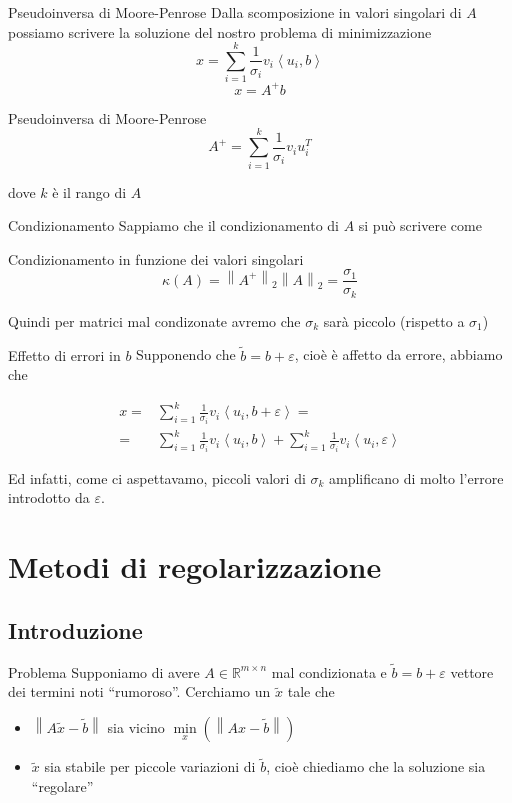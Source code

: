 \documentclass{beamer}
\theoremstyle{plain}
\theoremstyle{definition}
\theoremstyle{remark}
\newcommand{\set}[1]{\left\{#1\right\}}
\newcommand{\pa}[1]{\left(#1\right)}
\newcommand{\ang}[1]{\left<#1\right>}
\newcommand{\norm}[1]{\left\|#1\right\|}
\begin{document}
\begin{frame}{Pseudoinversa di Moore-Penrose}
  Dalla scomposizione in valori singolari di $A$ possiamo scrivere la
  soluzione del nostro problema di minimizzazione
  \[ x = \sum _{i=1} ^k \frac{1}{\sigma _i} v_i \ang{u_i,b} \]
  \[ x = A^+ b \]
  \begin{block}{Pseudoinversa di Moore-Penrose}
    \[ A^+ = \sum _{i=1} ^k \frac{1}{\sigma _i} v_i u_i ^T\]
  \end{block}
  dove $k$ è il rango di $A$
\end{frame}

\begin{frame}{Condizionamento}
  Sappiamo che il condizionamento di $A$ si può scrivere come
  \begin{block}{Condizionamento in funzione dei valori singolari}
    \[ \kappa (A) = \norm{A^+}_2\norm{A}_2 = \frac{\sigma _1}{\sigma
    _k} \]
  \end{block}

  Quindi per matrici mal condizonate avremo che $\sigma _k$ sarà
  piccolo (rispetto a $\sigma_1$)
\end{frame}

\begin{frame}{Effetto di errori in $b$}
  Supponendo che $\tilde b = b+ \varepsilon$, cioè è affetto da
  errore, abbiamo che 
  
  \begin{align*}
    x =& \sum _{i=1} ^k \frac{1}{\sigma _i} v_i \ang{u_i,b +
      \varepsilon} = \\
    =& \sum _{i=1} ^k \frac{1}{\sigma _i} v_i \ang{u_i,b} + \sum
    _{i=1} ^k \frac{1}{\sigma _i} v_i \ang{u_i,\varepsilon}
  \end{align*}

  Ed infatti, come ci aspettavamo, piccoli valori di $\sigma_k$
  amplificano di molto l'errore introdotto da $\varepsilon$.
\end{frame}


\section{Metodi di regolarizzazione}

\subsection{Introduzione}

\begin{frame}{Problema}
  Supponiamo di avere $A\in \mathbb{R}^{m \times n}$ mal condizionata
  e $\tilde b = b + \varepsilon$ vettore dei termini noti
  ``rumoroso''. Cerchiamo un $\tilde x$ tale che
  \begin{itemize}
  \item $\norm{A\tilde x-\tilde b}$ sia vicino $\min \limits_x
    \pa{\norm{A x - \tilde b}}$
  \item $\tilde x$ sia stabile per piccole variazioni di $\tilde b$,
    cioè chiediamo che la soluzione sia ``regolare''
  \end{itemize}
\end{frame}
\end{document}
